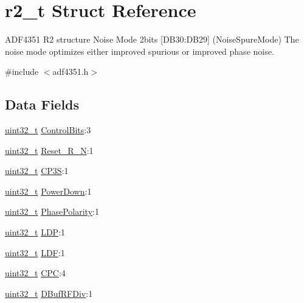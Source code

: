 \hypertarget{structr2__t}{}\section{r2\+\_\+t Struct Reference}
\label{structr2__t}


A\+D\+F4351 R2 structure Noise Mode 2bits \mbox{[}D\+B30\+:D\+B29\mbox{]} (Noise\+Spure\+Mode) The noise mode optimizes either improved spurious or improved phase noise.  




{\ttfamily \#include $<$adf4351.\+h$>$}

\subsection*{Data Fields}
\begin{DoxyCompactItemize}
\item 
\hyperlink{send_8c_a435d1572bf3f880d55459d9805097f62}{uint32\+\_\+t} \hyperlink{structr2__t_a3afba2088cc33e95e833436e6a111a6a}{Control\+Bits}\+:3
\item 
\hyperlink{send_8c_a435d1572bf3f880d55459d9805097f62}{uint32\+\_\+t} \hyperlink{structr2__t_a21c5fab8a85d13d5e47de5588780b094}{Reset\+\_\+\+R\+\_\+N}\+:1
\item 
\hyperlink{send_8c_a435d1572bf3f880d55459d9805097f62}{uint32\+\_\+t} \hyperlink{structr2__t_a378d00b9682aa05bffb1a3e61da036e4}{C\+P3S}\+:1
\item 
\hyperlink{send_8c_a435d1572bf3f880d55459d9805097f62}{uint32\+\_\+t} \hyperlink{structr2__t_a3aadc869234fb281b178032be276ca00}{Power\+Down}\+:1
\item 
\hyperlink{send_8c_a435d1572bf3f880d55459d9805097f62}{uint32\+\_\+t} \hyperlink{structr2__t_a05ebd4a6ece2e0641678b20f162e08ab}{Phase\+Polarity}\+:1
\item 
\hyperlink{send_8c_a435d1572bf3f880d55459d9805097f62}{uint32\+\_\+t} \hyperlink{structr2__t_a406cd49f63cb56882de02e7fe2ace6bf}{L\+DP}\+:1
\item 
\hyperlink{send_8c_a435d1572bf3f880d55459d9805097f62}{uint32\+\_\+t} \hyperlink{structr2__t_a42f019ff5be1600c098175eb64ab55da}{L\+DF}\+:1
\item 
\hyperlink{send_8c_a435d1572bf3f880d55459d9805097f62}{uint32\+\_\+t} \hyperlink{structr2__t_a71530b2c7c16577560cd14f14f320572}{C\+PC}\+:4
\item 
\hyperlink{send_8c_a435d1572bf3f880d55459d9805097f62}{uint32\+\_\+t} \hyperlink{structr2__t_a14726d1cf923d8e12279cd3038fa0540}{D\+Buf\+R\+F\+Div}\+:1

\end{DoxyCompactItemize}
